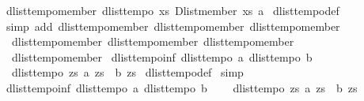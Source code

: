 \begin{isabellebody}
%
\isadelimproof
\isanewline
%
\endisadelimproof
\isanewline
{}\isamarkupfalse%
\ dlist{\isacharunderscore}tempo{\isacharunderscore}member{\isacharcolon}\ {\isachardoublequoteopen}dlist{\isacharunderscore}tempo\ {\isacharparenleft}{\isasymlambda}xs{\isachardot}\ Dlist{\isachardot}member\ xs\ a{\isacharparenright}{\isachardoublequoteclose}\isanewline
%
\isadelimproof
%
\endisadelimproof
%
\isatagproof
{}\isamarkupfalse%
\ dlist{\isacharunderscore}tempo{\isacharunderscore}def\ \isanewline
{}\isamarkupfalse%
\ {\isacharparenleft}simp\ add{\isacharcolon}\ dlist{\isacharunderscore}tempo{}{\isacharunderscore}member\ dlist{\isacharunderscore}tempo{}{\isacharunderscore}member\ dlist{\isacharunderscore}tempo{}{\isacharunderscore}member\ \isanewline
\ \ dlist{\isacharunderscore}tempo{}{\isacharunderscore}member\ dlist{\isacharunderscore}tempo{}{\isacharunderscore}member\ dlist{\isacharunderscore}tempo{}{\isacharunderscore}member\ \isanewline
\ \ dlist{\isacharunderscore}tempo{}{\isacharunderscore}member{\isacharparenright}%
\endisatagproof
{\isafoldproof}%
%
\isadelimproof
%
\endisadelimproof
%
\isamarkuptrue%
\isamarkupfalse%
\ dlist{\isacharunderscore}tempo{}{\isacharunderscore}inf{\isacharcolon}\ {\isachardoublequoteopen}{\isasymlbrakk}dlist{\isacharunderscore}tempo{}\ a{\isacharsemicolon}\ dlist{\isacharunderscore}tempo{}\ b{\isasymrbrakk}\ {\isasymLongrightarrow}\ \isanewline
\ \ dlist{\isacharunderscore}tempo{}\ {\isacharparenleft}{\isasymlambda}zs{\isachardot}\ a\ zs\ {\isasymand}\ b\ zs{\isacharparenright}{\isachardoublequoteclose}\isanewline
%
\isadelimproof
%
\endisadelimproof
%
\isatagproof
{}\isamarkupfalse%
\ dlist{\isacharunderscore}tempo{}{\isacharunderscore}def\isanewline
{}\isamarkupfalse%
\ simp%
\endisatagproof
{\isafoldproof}%
%
\isadelimproof
\isanewline
%
\endisadelimproof
\isanewline
{}\isamarkupfalse%
\ dlist{\isacharunderscore}tempo{}{\isacharunderscore}inf{\isacharcolon}\ {\isachardoublequoteopen}{\isasymlbrakk}dlist{\isacharunderscore}tempo{}\ a{\isacharsemicolon}\ dlist{\isacharunderscore}tempo{}\ b{\isasymrbrakk}\ {\isasymLongrightarrow}\ \isanewline
\ \ dlist{\isacharunderscore}tempo{}\ {\isacharparenleft}{\isasymlambda}zs{\isachardot}\ a\ zs\ {\isasymand}\ b\ zs{\isacharparenright}{\isachardoublequoteclose}\isanewline

\end{isabellebody}
